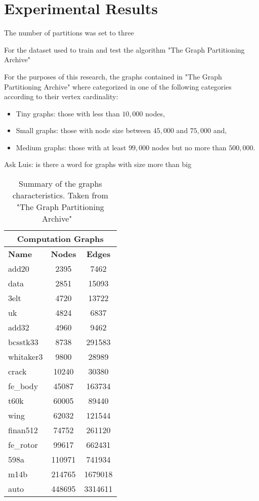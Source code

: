 %
%
\let\textcircled=\pgftextcircled
\chapter{Experimental Results}
\label{Chapter4}
The number of partitions was set to three 

For the dataset used to train and test the algorithm "The Graph Partitioning Archive"~\cite{archive}

For the purposes of this research, the graphs contained in "The Graph Partitioning Archive" where categorized in one of the following categories according to their vertex cardinality: 
\begin{itemize}
    \item Tiny graphs: those with less than $10,000$ nodes,
    \item Small graphs: those with node size between $45,000$ and $75,000$ and,
    \item Medium graphs: those with at least $99,000$ nodes but no more than $500,000$.
\end{itemize}

Ask Luis: is there a word for graphs with size more than big

\begin{table}
\centering
\begin{tabular}{ |p{1.75cm}||cc|  }
\hline
\multicolumn{3}{|c|}{\textbf{Computation Graphs}} \\
\hline
\hline
\textbf{Name} & \textbf{Nodes} & \textbf{Edges} \\
\hline
add20 & 2395 & 7462  \\
data & 2851 & 15093  \\
3elt & 4720 & 13722  \\
uk & 4824 & 6837  \\
add32 & 4960 & 9462  \\
bcsstk33 & 8738 & 291583  \\
whitaker3 & 9800 & 28989  \\
crack & 10240 & 30380  \\
\hline
fe\_body & 45087 & 163734  \\
t60k & 60005 & 89440  \\
wing & 62032 & 121544  \\
finan512 & 74752 & 261120 \\
\hline
fe\_rotor & 99617 & 662431  \\
598a & 110971 & 741934  \\
m14b & 214765 & 1679018	 \\
auto & 448695 & 3314611  \\
\hline
\end{tabular}
\caption{\label{tab:results}Summary of the graphs characteristics. Taken from "The Graph Partitioning Archive" ~\cite{archive}}
\end{table}

